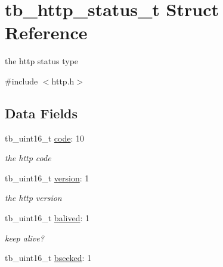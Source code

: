 \hypertarget{structtb__http__status__t}{\section{tb\-\_\-http\-\_\-status\-\_\-t Struct Reference}
\label{structtb__http__status__t}
}


the http status type  




{\ttfamily \#include $<$http.\-h$>$}

\subsection*{Data Fields}
\begin{DoxyCompactItemize}
\item 
\hypertarget{structtb__http__status__t_a7b954ae0bc65ff31016175d94f7378b9}{tb\-\_\-uint16\-\_\-t \hyperlink{structtb__http__status__t_a7b954ae0bc65ff31016175d94f7378b9}{code}\-: 10}\label{structtb__http__status__t_a7b954ae0bc65ff31016175d94f7378b9}

\begin{DoxyCompactList}\small\item\em the http code \end{DoxyCompactList}\item 
\hypertarget{structtb__http__status__t_ac8632393036dd90e4e53090a10694908}{tb\-\_\-uint16\-\_\-t \hyperlink{structtb__http__status__t_ac8632393036dd90e4e53090a10694908}{version}\-: 1}\label{structtb__http__status__t_ac8632393036dd90e4e53090a10694908}

\begin{DoxyCompactList}\small\item\em the http version \end{DoxyCompactList}\item 
\hypertarget{structtb__http__status__t_a3c6de36f8496cd524bf744ed1579d453}{tb\-\_\-uint16\-\_\-t \hyperlink{structtb__http__status__t_a3c6de36f8496cd524bf744ed1579d453}{balived}\-: 1}\label{structtb__http__status__t_a3c6de36f8496cd524bf744ed1579d453}

\begin{DoxyCompactList}\small\item\em keep alive? \end{DoxyCompactList}\item 
\hypertarget{structtb__http__status__t_afd05eff53916839c7cb64b24101c76f3}{tb\-\_\-uint16\-\_\-t \hyperlink{structtb__http__status__t_afd05eff53916839c7cb64b24101c76f3}{bseeked}\-: 1}\label{structtb__http__status__t_afd05eff53916839c7cb64b24101c76f3}


\end{DoxyCompactItemize}
